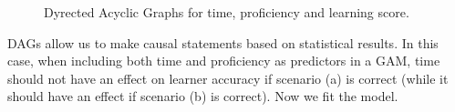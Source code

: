\documentclass[
  letterpaper,
  DIV=11,
  numbers=noendperiod]{scrartcl}
\begin{document}
\begin{figure}

\begin{minipage}{0.50\linewidth}



\end{minipage}%
%
\begin{minipage}{0.50\linewidth}



\end{minipage}%

\caption{\label{fig-d1-dag}Dyrected Acyclic Graphs for time, proficiency
and learning score.}

\end{figure}%

DAGs allow us to make causal statements based on statistical results. In
this case, when including both time and proficiency as predictors in a
GAM, time should not have an effect on learner accuracy if scenario (a)
is correct (while it should have an effect if scenario (b) is correct).
Now we fit the model.
\end{document}
